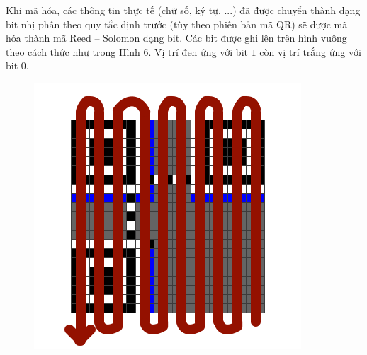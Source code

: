 \begin{multicols}{2}
\begin{figure}[H]
		\vspace*{-10pt}
	\end{figure}
	Khi mã hóa, các thông tin thực tế (chữ số, ký tự, ...) đã được chuyển thành dạng bit nhị phân theo quy tắc định trước (tùy theo phiên bản mã QR) sẽ được mã hóa thành mã Reed -- Solomon dạng bit. Các bit được ghi lên trên hình vuông theo cách thức như trong Hình $6$. Vị trí đen ứng với bit $1$ còn vị trí trắng ứng với bit $0$.
	\begin{figure}[H]
		\vspace*{-5pt}
		\centering
		\captionsetup{labelformat= empty, justification=centering}
		\includegraphics[height=0.38\linewidth]{11}
		

\end{figure}
\end{multicols}
